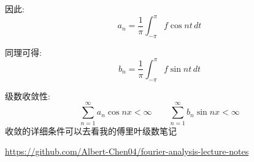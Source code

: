 \documentclass[a4paper, 12pt, oneside]{article} %
\numberwithin{subsection}{section}
\numberwithin{subsubsection}{subsection}
\theoremstyle{plain}
\theoremstyle{definition}
\theoremstyle{remark}
\begin{document}
		因此:
		\begin{equation}
			a_n = \frac{1}{\pi} \int_{-\pi}^{\pi} f \cos nt \, dt
		\end{equation}
		
		同理可得:
		\begin{equation}
			b_n = \frac{1}{\pi} \int_{-\pi}^{\pi} f \sin nt \, dt
		\end{equation}
		
		级数收敛性:
		\begin{equation}
			\sum_{n=1}^{\infty} a_n \cos nx < \infty \qquad \sum_{n=1}^{\infty} b_n \sin nx < \infty
		\end{equation}
		收敛的详细条件可以去看我的傅里叶级数笔记
		
		\url{https://github.com/Albert-Chen04/fourier-analysis-lecture-notes}
		
\end{document}

